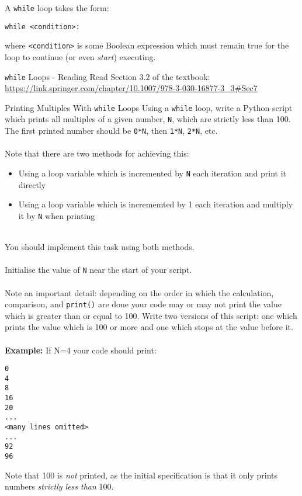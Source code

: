 \documentclass{lab}
\begin{document}
A \texttt{while} loop takes the form:

\texttt{while <condition>:}

where \texttt{<condition>} is some Boolean expression which must remain true for the loop to continue (or even \textit{start}) executing.

\begin{task}{\texttt{while} Loops - Reading}{}
Read Section 3.2 of the textbook: \url{https://link.springer.com/chapter/10.1007/978-3-030-16877-3_3#Sec7}
\end{task}

\begin{task}{Printing Multiples With \texttt{while} Loops}{}
Using a \texttt{while} loop, write a Python script which prints all multiples of a given number, \texttt{N}, which are strictly less than 100. The first printed number should be \texttt{0*N}, then \texttt{1*N}, \texttt{2*N}, etc.
\\~\\
Note that there are two methods for achieving this:
\\
\begin{itemize}
\item Using a loop variable which is incremented by \texttt{N} each iteration and print it directly
\item Using a loop variable which is incrememted by 1 each iteration and multiply it by \texttt{N} when printing
\end{itemize}
~\\
You should implement this task using both methods.
\\~\\
Initialise the value of \texttt{N} near the start of your script.
\\~\\
Note an important detail: depending on the order in which the calculation, comparison, and \texttt{print()} are done your code may or may not print the value which is greater than or equal to 100. Write two versions of this script: one which prints the value which is 100 or more and one which stops at the value before it.
\\~\\
\textbf{Example:} If N=4 your code should print:
\begin{lstlisting}
0
4
8
16
20
...
<many lines omitted>
...
92
96
\end{lstlisting}
Note that 100 is \textit{not} printed, as the initial specification is that it only prints numbers \textit{strictly less than} 100.
\end{task}
\end{document}
